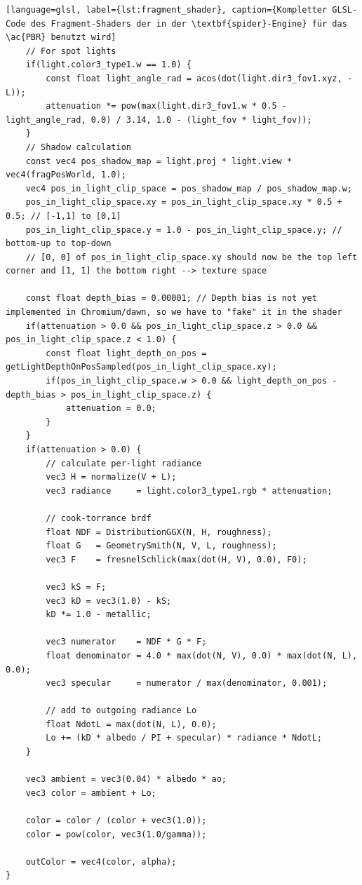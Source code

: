 \documentclass[oneside]{ausarbeitung}
\begin{document}
\begin{lstlisting}[language=glsl, label={lst:fragment_shader}, caption={Kompletter GLSL-Code des Fragment-Shaders der in der \textbf{spider}-Engine} für das \ac{PBR} benutzt wird]
    // For spot lights
    if(light.color3_type1.w == 1.0) {
        const float light_angle_rad = acos(dot(light.dir3_fov1.xyz, -L));
        attenuation *= pow(max(light.dir3_fov1.w * 0.5 - light_angle_rad, 0.0) / 3.14, 1.0 - (light_fov * light_fov));
    }
    // Shadow calculation
    const vec4 pos_shadow_map = light.proj * light.view * vec4(fragPosWorld, 1.0);
    vec4 pos_in_light_clip_space = pos_shadow_map / pos_shadow_map.w;
    pos_in_light_clip_space.xy = pos_in_light_clip_space.xy * 0.5 + 0.5; // [-1,1] to [0,1]
    pos_in_light_clip_space.y = 1.0 - pos_in_light_clip_space.y; // bottom-up to top-down
    // [0, 0] of pos_in_light_clip_space.xy should now be the top left corner and [1, 1] the bottom right --> texture space

    const float depth_bias = 0.00001; // Depth bias is not yet implemented in Chromium/dawn, so we have to "fake" it in the shader
    if(attenuation > 0.0 && pos_in_light_clip_space.z > 0.0 && pos_in_light_clip_space.z < 1.0) {
        const float light_depth_on_pos = getLightDepthOnPosSampled(pos_in_light_clip_space.xy);
        if(pos_in_light_clip_space.w > 0.0 && light_depth_on_pos - depth_bias > pos_in_light_clip_space.z) {
            attenuation = 0.0;
        }
    }
    if(attenuation > 0.0) {
        // calculate per-light radiance
        vec3 H = normalize(V + L);
        vec3 radiance     = light.color3_type1.rgb * attenuation;
        
        // cook-torrance brdf
        float NDF = DistributionGGX(N, H, roughness);
        float G   = GeometrySmith(N, V, L, roughness);
        vec3 F    = fresnelSchlick(max(dot(H, V), 0.0), F0);
        
        vec3 kS = F;
        vec3 kD = vec3(1.0) - kS;
        kD *= 1.0 - metallic;
        
        vec3 numerator    = NDF * G * F;
        float denominator = 4.0 * max(dot(N, V), 0.0) * max(dot(N, L), 0.0);
        vec3 specular     = numerator / max(denominator, 0.001);  
            
        // add to outgoing radiance Lo
        float NdotL = max(dot(N, L), 0.0);                
        Lo += (kD * albedo / PI + specular) * radiance * NdotL;
    }
  
    vec3 ambient = vec3(0.04) * albedo * ao;
    vec3 color = ambient + Lo;
	
    color = color / (color + vec3(1.0));
    color = pow(color, vec3(1.0/gamma));  
   
    outColor = vec4(color, alpha);
}
\end{lstlisting}
\end{document}
